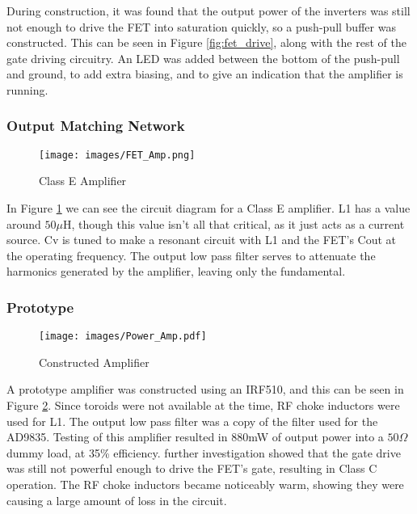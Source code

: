 \documentclass[a4paper,12pt]{article}
\begin{document}
During construction, it was found that the output power of the inverters was still not enough to drive the FET into saturation quickly, so a push-pull buffer was constructed. This can be seen in Figure \ref{fig:fet_drive}, along with the rest of the gate driving circuitry. An LED was added between the bottom of the push-pull and ground, to add extra biasing, and to give an indication that the amplifier is running. 

\subsubsection{Output Matching Network}

\begin{figure}[h]
  \begin{center}
    \texttt{[image: images/FET\_Amp.png]}
  \end{center}
  \caption{Class E Amplifier}
  \label{fig:fet_amp}
\end{figure}

In Figure \ref{fig:fet_amp} we can see the circuit diagram for a Class E amplifier. L1 has a value around $50\mu$H, though this value isn't all that critical, as it just acts as a current source. Cv is tuned to make a resonant circuit with L1 and the FET's Cout at the operating frequency. The output low pass filter serves to attenuate the harmonics generated by the amplifier, leaving only the fundamental. 

\subsubsection{Prototype}

\begin{figure}[h]
  \begin{center}
    \texttt{[image: images/Power\_Amp.pdf]}
  \end{center}
  \caption{Constructed Amplifier}
  \label{fig:power_amp}
\end{figure}

A prototype amplifier was constructed using an IRF510, and this can be seen in Figure \ref{fig:power_amp}. Since toroids were not available at the time, RF choke inductors were used for L1. The output low pass filter was a copy of the filter used for the AD9835. Testing of this amplifier resulted in 880mW of output power into a $50\Omega$ dummy load, at 35\% efficiency. further investigation showed that the gate drive was still not powerful enough to drive the FET's gate, resulting in Class C operation. The RF choke inductors became noticeably warm, showing they were causing a large amount of loss in the circuit. 
\end{document}
